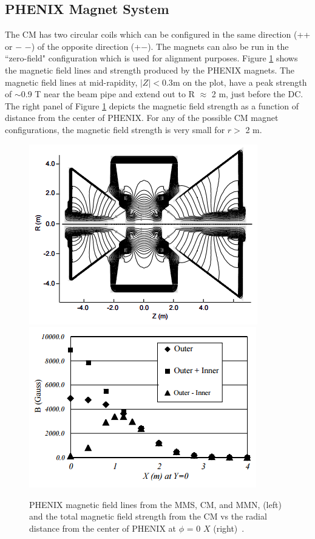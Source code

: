 \subsection{PHENIX Magnet System}
 The CM has two circular coils which can be configured in the same direction (++ or $-$ $-$) of the opposite direction (+$-$). The magnets can also be run in the ``zero-field" configuration which is used for alignment purposes. Figure \ref{fig:magnet_figures} shows the magnetic field lines and strength produced by the PHENIX magnets. The magnetic field lines at mid-rapidity, $|Z| < 0.3$m on the plot, have a peak strength of $\sim$0.9 T near the beam pipe and extend out to R $\approx$ 2 m, just before the DC. The right panel of Figure \ref{fig:magnet_figures} depicts the magnetic field strength as a function of distance from the center of PHENIX. For any of the possible CM magnet configurations, the magnetic field strength is very small for $r > $ 2 m.
\begin{figure}[!ht]
\begin{center}
\includegraphics[width=0.45\linewidth]{figs/magnet_map.png}
\includegraphics[width=0.45\linewidth]{figs/magnetic_field_strength.png}
\caption{PHENIX magnetic field lines from the MMS, CM, and MMN, (left) and the total magnetic field strength from the CM vs the radial distance from the center of PHENIX at $\phi$ = 0 $X$ (right)~\cite{Aronson2003480}.}
\label{fig:magnet_figures}
\end{center}
\end{figure}
